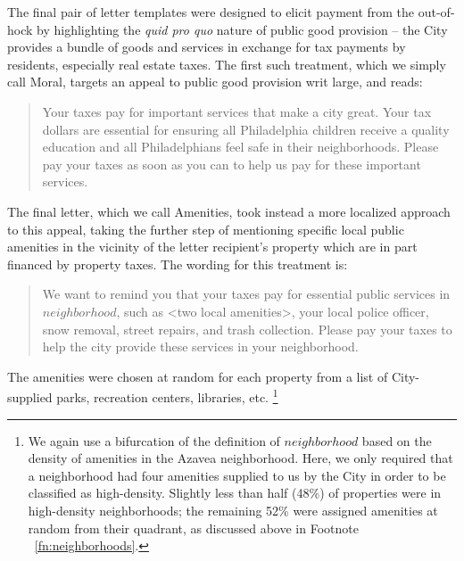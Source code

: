 \documentclass[12pt,titlepage]{article}
\begin{document}
The final pair of letter templates were designed to elicit payment from 
the out-of-hock by highlighting the \textit{quid pro quo} nature of
public good provision – the City provides a bundle of goods and services
in exchange for tax payments by residents, especially real estate taxes.
The first such treatment, which we simply call Moral, targets an appeal 
to public good provision writ large, and reads:

\blockquote{
	Your taxes pay for important services that make a city great. Your 
	tax dollars are essential for ensuring all Philadelphia children 
	receive a quality education and all Philadelphians feel safe in 
	their neighborhoods. Please pay your taxes as soon as you can 
	to help us pay for these important services. 
}

The final letter, which we call Amenities, took instead a more 
localized approach to this appeal, taking the further step of mentioning 
specific local public amenities in the vicinity of the letter recipient's property 
which are in part financed by property taxes. The wording for this treatment is:

\blockquote{
	We want to remind you that your taxes pay for essential public services 
	in $neighborhood$, such as <two local amenities>, your local police officer, 
	snow removal, street repairs, and trash collection. Please pay your taxes 
	to help the city provide these services in your neighborhood.
}

The amenities were chosen at random for each property from a list of 
City-supplied parks, recreation centers, libraries, etc.
\footnote{
	We again use a bifurcation of the definition of $neighborhood$ based on
	the density of amenities in the Azavea neighborhood. Here, we only 
	required that a neighborhood had four amenities supplied to us by the
	City in order to be classified as high-density. Slightly less than 
	half (48\%) of properties were in high-density neighborhoods; the 
	remaining 52\% were assigned amenities at random from their quadrant, 
	as discussed above in Footnote ~\ref{fn:neighborhoods}. 
}
\end{document}
